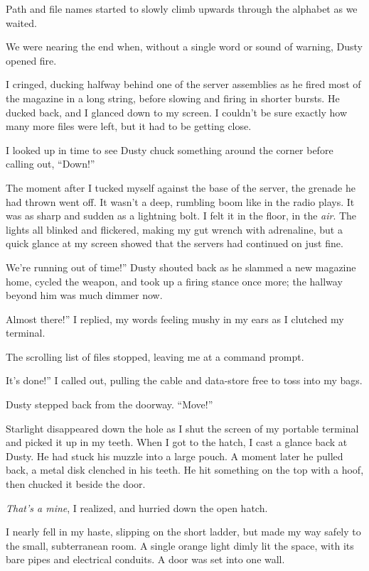 Path and file names started to slowly climb upwards through the alphabet as we waited.

We were nearing the end when, without a single word or sound of warning, Dusty opened fire.

I cringed, ducking halfway behind one of the server assemblies as he fired most of the magazine in a long string, before slowing and firing in shorter bursts. He ducked back, and I glanced down to my screen. I couldn’t be sure exactly how many more files were left, but it had to be getting close.

I looked up in time to see Dusty chuck something around the corner before calling out, “Down!”

The moment after I tucked myself against the base of the server, the grenade he had thrown went off. It wasn’t a deep, rumbling boom like in the radio plays. It was as sharp and sudden as a lightning bolt. I felt it in the floor, in the \textit{air}. The lights all blinked and flickered, making my gut wrench with adrenaline, but a quick glance at my screen showed that the servers had continued on just fine.

\leavevmode{}We’re running out of time!” Dusty shouted back as he slammed a new magazine home, cycled the weapon, and took up a firing stance once more; the hallway beyond him was much dimmer now.

\leavevmode{}Almost there!” I replied, my words feeling mushy in my ears as I clutched my terminal.

The scrolling list of files stopped, leaving me at a command prompt.

\leavevmode{}It’s done!” I called out, pulling the cable and data-store free to toss into my bags.

Dusty stepped back from the doorway. “Move!”

Starlight disappeared down the hole as I shut the screen of my portable terminal and picked it up in my teeth. When I got to the hatch, I cast a glance back at Dusty. He had stuck his muzzle into a large pouch. A moment later he pulled back, a metal disk clenched in his teeth. He hit something on the top with a hoof, then chucked it beside the door.

\textit{That’s a mine}, I realized, and hurried down the open hatch.

I nearly fell in my haste, slipping on the short ladder, but made my way safely to the small, subterranean room. A single orange light dimly lit the space, with its bare pipes and electrical conduits. A door was set into one wall.

